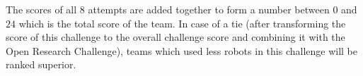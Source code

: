 \documentclass[12pt]{article}
\begin{document}
The scores of all \(8\) attempts are added together to form a number between \(0\) and \(24\) which is the total score of the team. In case of a tie (after transforming the score of this challenge to the overall challenge score and combining it with the Open Research Challenge), teams which used less robots in this challenge will be ranked superior.
\end{document}
